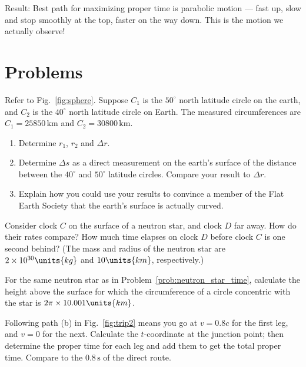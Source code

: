 Result: Best path for maximizing proper time is parabolic motion ---
fast up, slow and stop smoothly at the top, faster on the way down.
This is the motion we actually observe!

\newpage     

\section*{Problems}

\begin{problem}
  Refer to Fig.~\ref{fig:sphere}.  Suppose $C_1$ is the $50^\circ$
  north latitude circle on the earth, and $C_2$ is the $40^\circ$
  north latitude circle on Earth.  The measured circumferences are
  $C_1 = 25850\, \mbox{km}$ and $C_2 = 30800\, \mbox{km}$.
  \begin{enumerate}
  \item Determine $r_1$, $r_2$ and $\Delta r$.
  \item Determine $\Delta s$ as a direct measurement on the earth's surface
    of the distance between the $40^\circ$ and $50^\circ$ latitude
    circles.  Compare your result to $\Delta r$.
  \item Explain how you could use your results to convince a member of
    the Flat Earth Society that the earth's surface is actually
    curved.
  \end{enumerate}
  \label{prob:sphere}
\end{problem}


\begin{problem}
  Consider clock $C$ on the surface of a neutron star, and clock $D$
  far away.  How do their rates compare?  How much time elapses on
  clock $D$ before clock $C$ is one second behind?  (The mass and
  radius of the neutron star are $2\times 10^{30}\units{kg}$ and
  $10\units{km}$, respectively.)
  \label{prob:neutron_star_time}
\end{problem}

\begin{problem}
  For the same neutron star as in
  Problem~\ref{prob:neutron_star_time}, calculate the height above
  the surface for which the circumference of a circle concentric with
  the star is $2\pi\times 10.001\units{km}$.
  \label{prob:neutron_star_space}
\end{problem}


\begin{problem}
  Following path (b) in Fig.~\ref{fig:trip2} means you go at $v =
  0.8c$ for the first leg, and $v = 0$ for the next.  Calculate the
  $t$-coordinate at the junction point; then determine the proper time
  for each leg and add them to get the total proper time.  Compare to
  the $0.8\, \mbox{s}$ of the direct route.
  \label{prob:trip}
\end{problem}

